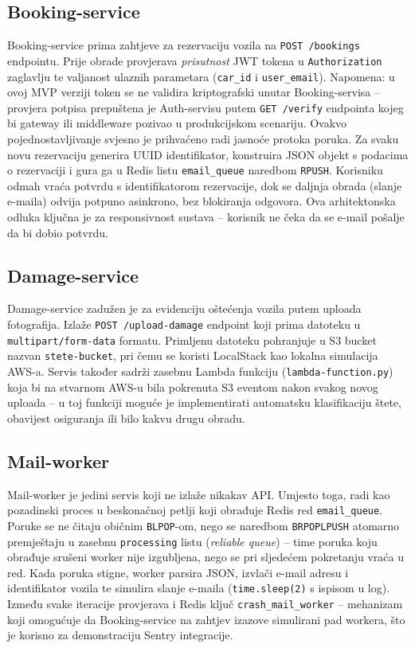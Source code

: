 \documentclass[12pt,a4paper]{article}
\begin{document}
\subsection{Booking-service}

Booking-service prima zahtjeve za rezervaciju vozila na \texttt{POST /bookings} endpointu. Prije obrade provjerava \emph{prisutnost} JWT tokena u \texttt{Authorization} zaglavlju te valjanost ulaznih parametara (\texttt{car\_id} i \texttt{user\_email}). Napomena: u ovoj MVP verziji token se ne validira kriptografski unutar Booking-servisa -- provjera potpisa prepuštena je Auth-servisu putem \texttt{GET /verify} endpointa kojeg bi gateway ili middleware pozivao u produkcijskom scenariju. Ovakvo pojednostavljivanje svjesno je prihvaćeno radi jasnoće protoka poruka. Za svaku novu rezervaciju generira UUID identifikator, konstruira JSON objekt s podacima o rezervaciji i gura ga u Redis listu \texttt{email\_queue} naredbom \texttt{RPUSH}. Korisniku odmah vraća potvrdu s identifikatorom rezervacije, dok se daljnja obrada (slanje e-maila) odvija potpuno asinkrono, bez blokiranja odgovora. Ova arhitektonska odluka ključna je za responsivnost sustava -- korisnik ne čeka da se e-mail pošalje da bi dobio potvrdu.

\subsection{Damage-service}

Damage-service zadužen je za evidenciju oštećenja vozila putem uploada fotografija. Izlaže \texttt{POST /upload-damage} endpoint koji prima datoteku u \texttt{multipart/form-data} formatu. Primljenu datoteku pohranjuje u S3 bucket nazvan \texttt{stete-bucket}, pri čemu se koristi LocalStack kao lokalna simulacija AWS-a. Servis također sadrži zasebnu Lambda funkciju (\texttt{lambda-function.py}) koja bi na stvarnom AWS-u bila pokrenuta S3 eventom nakon svakog novog uploada -- u toj funkciji moguće je implementirati automatsku klasifikaciju štete, obavijest osiguranja ili bilo kakvu drugu obradu.

\subsection{Mail-worker}

Mail-worker je jedini servis koji ne izlaže nikakav API. Umjesto toga, radi kao pozadinski proces u beskonačnoj petlji koji obrađuje Redis red \texttt{email\_queue}. Poruke se ne čitaju običnim \texttt{BLPOP}-om, nego se naredbom \texttt{BRPOPLPUSH} atomarno premještaju u zasebnu \texttt{processing} listu (\emph{reliable queue}) -- time poruka koju obrađuje srušeni worker nije izgubljena, nego se pri sljedećem pokretanju vraća u red. Kada poruka stigne, worker parsira JSON, izvlači e-mail adresu i identifikator vozila te simulira slanje e-maila (\texttt{time.sleep(2)} s ispisom u log). Između svake iteracije provjerava i Redis ključ \texttt{crash\_mail\_worker} -- mehanizam koji omogućuje da Booking-service na zahtjev izazove simulirani pad workera, što je korisno za demonstraciju Sentry integracije.
\end{document}
